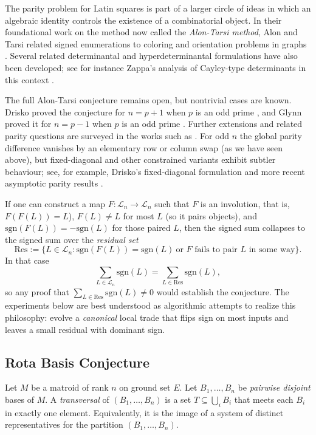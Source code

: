 \documentclass[11pt]{amsart}
\newcommand{\sgn}{\mathrm{sgn}}
\newcommand{\Ln}{\mathcal{L}_n}
\newcommand{\Res}{\mathrm{Res}}
\begin{document}
The parity problem for Latin squares is part of a larger circle of ideas in which an algebraic identity controls the existence of a combinatorial object. In their foundational work on the method now called the \emph{Alon-Tarsi method}, Alon and Tarsi related signed enumerations to coloring and orientation problems in graphs \cite{AT92}. Several related determinantal and hyperdeterminantal formulations have also been developed; see for instance Zappa's analysis of Cayley-type determinants in this context \cite{Zappa1997}.

The full Alon-Tarsi conjecture remains open, but nontrivial cases are known.
Drisko proved the conjecture for $n=p+1$ when $p$ is an odd prime \cite{Dr97}, and Glynn proved it for $n=p-1$ when $p$ is an odd prime \cite{Gly10}.
Further extensions and related parity questions are surveyed in the works such as \cite{Sto12,FriedmanMcGuinness2019}.
For odd $n$ the global parity difference vanishes by an elementary row or column swap (as we have seen above), but fixed-diagonal and other constrained variants exhibit subtler behaviour; see, for example, Drisko's fixed-diagonal formulation \cite{Dr98} and more recent asymptotic parity results \cite{CavenaghWanless2016}.

If one can construct a map $F:\Ln\to\Ln$ such that $F$ is an involution, that is, $F(F(L))=L$), $F(L)\neq L$ for most $L$ (so it pairs objects), and $\sgn(F(L))=-\sgn(L)$ for those paired $L$, then the signed sum collapses to the signed sum over the \emph{residual set}
\[
\Res:=\{L\in\Ln: \sgn(F(L))=\sgn(L)\ \text{or $F$ fails to pair $L$ in some way}\}.
\]
In that case
\[
\sum_{L\in\Ln}\sgn(L)=\sum_{L\in\Res}\sgn(L),
\]
so any proof that $\sum_{L\in\Res}\sgn(L)\neq 0$ would establish the conjecture.
The experiments below are best understood as algorithmic attempts to realize this philosophy: evolve a \emph{canonical} local trade that flips sign on most inputs and leaves a small residual with dominant sign. 

\subsection{Rota Basis Conjecture}
Let $M$ be a matroid of rank $n$ on ground set $E$.
Let $B_1,\dots,B_n$ be \emph{pairwise disjoint} bases of $M$.
A \emph{transversal} of $(B_1,\dots,B_n)$ is a set $T\subseteq \bigcup_i B_i$ that meets each $B_i$ in exactly one element.
Equivalently, it is the image of a system of distinct representatives for the partition $(B_1,\dots,B_n)$.
\end{document}
